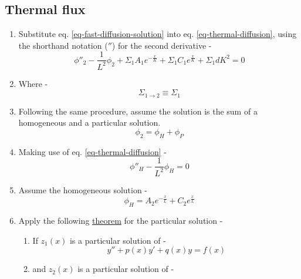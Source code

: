 \documentclass[11pt,a4paper]{article}
\begin{document}
\subsection{Thermal flux}
\begin{enumerate}[leftmargin=*,topsep=0pt]
    \item Substitute eq. \ref{eq-fast-diffusion-solution} into eq. \ref{eq-thermal-diffusion}, using the shorthand notation ($''$) for the second derivative - 
        \begin{equation} \label{eq-thermal-diffusion-model}
            \phi''_2-\frac{1}{L^2}\phi_2+\Sigma_1 A_1e^{-\frac{x}{K}}+\Sigma_1 C_1e^{\frac{x}{K}}+\Sigma_1 dK^2=0
        \end{equation}
    \item[] Where - 
        \begin{equation*}
            \Sigma_{1 \rightarrow 2} \equiv \Sigma_1
        \end{equation*}
    \item Following the same procedure, assume the solution is the sum of a homogeneous and a particular solution. 
        \begin{equation} \label{eq-thermal-general-solution}
            \phi_2=\phi_H+\phi_P
        \end{equation}
    \item Making use of eq. \ref{eq-thermal-diffusion} - 
        \begin{equation}
            \phi''_H-\frac{1}{L^2}\phi_H=0
        \end{equation}
    \item Assume the homogeneous solution -
        \begin{equation} \label{eq-thermal-homogeneous-solution}
            \phi_H=A_2e^{-\frac{x}{L}}+C_2e^{\frac{x}{L}}
        \end{equation}
    \item Apply the following \href{https://www.math.uh.edu/~etgen/5389-Chap3.pdf}{theorem} for the particular solution - 
        \begin{enumerate}[leftmargin=*,topsep=0pt]
            \item If $z_1(x)$ is a particular solution of - 
                \begin{equation*}
                    y''+p(x)y'+q(x)y=f(x)
                \end{equation*}
            \item and $z_2(x)$ is a particular solution of - 
                \begin{equation*}

\end{equation*}
\end{enumerate}
\end{enumerate}
\end{document}
